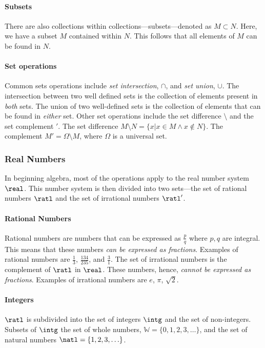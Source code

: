 \paragraph{Subsets}
There are also collections within collections---subsets---denoted as $M \subset N$.
Here, we have a subset $M$ contained within $N$.
This follows that all elements of $M$ can be found in $N$.

\paragraph{Set operations}
Common sets operations include \emph{set intersection}, $\cap$, and \emph{set union}, $\cup$.
The intersection between two well defined sets is the collection of elements present in \emph{both} sets.
The union of two well-defined sets is the collection of elements that can be found in \emph{either} set.
Other set operations include the set difference $\setminus$ and the set complement $'$. The set difference $M \setminus N = \{x | x \in M \land x \notin N\}$. The complement $M' = \Omega \setminus M$, where $\Omega$ is a universal set.

\subsubsection{Real Numbers}
In beginning algebra, most of the operations apply to the real number system $\real$.
This number system is then divided into two sets---the set of rational numbers $\ratl$ and the set of irrational numbers $\ratl '$.

\paragraph{Rational Numbers}
Rational numbers are numbers that can be expressed as $\frac{p}{q}$ where $p, q$ are integral.
This means that these numbers \emph{can be expressed as fractions}.
Examples of rational numbers are $\frac{1}{3}$, $\frac{134}{235}$, and $\frac{3}{1}$.
The set of irrational numbers is the complement of $\ratl$ in $\real$.
These numbers, hence, \emph{cannot be expressed as fractions}.
Examples of irrational numbers are $e$, $\pi$, $\sqrt{2}$.

\paragraph{Integers}
$\ratl$ is subdivided into the set of integers $\intg$ and the set of non-integers.
Subsets of $\intg$ the set of whole numbers, $\mathbb{W} = \{0, 1, 2, 3, \ldots\}$, and the set of natural numbers $\natl = \{1, 2, 3, \ldots\}$.

